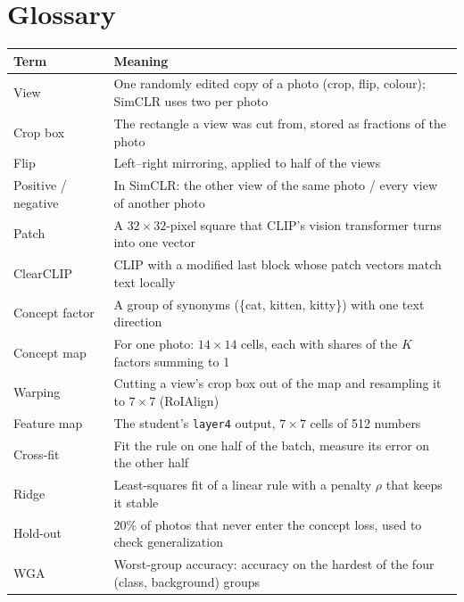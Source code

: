 \documentclass[11pt]{article}
\begin{document}
\section{Glossary}
\begin{table}[H]
\centering
\small
\begin{tabularx}{\linewidth}{l X}
\toprule
Term & Meaning \\
\midrule
View & One randomly edited copy of a photo (crop, flip, colour); SimCLR uses two per photo \\
Crop box & The rectangle a view was cut from, stored as fractions of the photo \\
Flip & Left--right mirroring, applied to half of the views \\
Positive / negative & In SimCLR: the other view of the same photo / every view of another photo \\
Patch & A $32\times32$-pixel square that CLIP's vision transformer turns into one vector \\
ClearCLIP & CLIP with a modified last block whose patch vectors match text locally \\
Concept factor & A group of synonyms (\{cat, kitten, kitty\}) with one text direction \\
Concept map & For one photo: $14\times14$ cells, each with shares of the $K$ factors summing to 1 \\
Warping & Cutting a view's crop box out of the map and resampling it to $7\times7$ (RoIAlign) \\
Feature map & The student's \texttt{layer4} output, $7\times7$ cells of 512 numbers \\
Cross-fit & Fit the rule on one half of the batch, measure its error on the other half \\
Ridge & Least-squares fit of a linear rule with a penalty $\rho$ that keeps it stable \\
Hold-out & 20\% of photos that never enter the concept loss, used to check generalization \\
WGA & Worst-group accuracy: accuracy on the hardest of the four (class, background) groups \\
\bottomrule
\end{tabularx}
\end{table}
\end{document}
